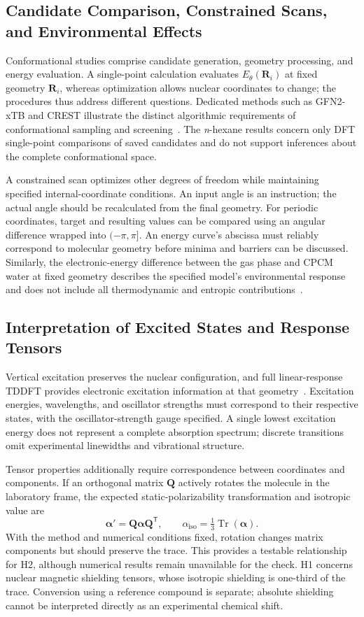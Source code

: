 \subsection{Candidate Comparison, Constrained Scans, and Environmental Effects}
Conformational studies comprise candidate generation, geometry processing, and energy evaluation.
A single-point calculation evaluates $E_{\theta}(\mathbf R_i)$ at fixed geometry $\mathbf R_i$, whereas optimization allows nuclear coordinates to change; the procedures thus address different questions.
Dedicated methods such as GFN2-xTB and CREST illustrate the distinct algorithmic requirements of conformational sampling and screening~\cite{gfn2,crest}.
The \textit{n}-hexane results concern only DFT single-point comparisons of saved candidates and do not support inferences about the complete conformational space.

A constrained scan optimizes other degrees of freedom while maintaining specified internal-coordinate conditions.
An input angle is an instruction; the actual angle should be recalculated from the final geometry.
For periodic coordinates, target and resulting values can be compared using an angular difference wrapped into $(-\pi,\pi]$.
An energy curve's abscissa must reliably correspond to molecular geometry before minima and barriers can be discussed.
Similarly, the electronic-energy difference between the gas phase and CPCM water at fixed geometry describes the specified model's environmental response and does not include all thermodynamic and entropic contributions~\cite{cpcm}.

\subsection{Interpretation of Excited States and Response Tensors}
Vertical excitation preserves the nuclear configuration, and full linear-response TDDFT provides electronic excitation information at that geometry~\cite{tddft}.
Excitation energies, wavelengths, and oscillator strengths must correspond to their respective states, with the oscillator-strength gauge specified.
A single lowest excitation energy does not represent a complete absorption spectrum; discrete transitions omit experimental linewidths and vibrational structure.

Tensor properties additionally require correspondence between coordinates and components.
If an orthogonal matrix $\mathbf Q$ actively rotates the molecule in the laboratory frame, the expected static-polarizability transformation and isotropic value are
\begin{equation}
  \boldsymbol\alpha'=\mathbf Q\boldsymbol\alpha\mathbf Q^{\mathsf T},
  \qquad \alpha_{\mathrm{iso}}=\tfrac13\operatorname{Tr}(\boldsymbol\alpha).
  \label{eq:tensor-rotation}
\end{equation}
With the method and numerical conditions fixed, rotation changes matrix components but should preserve the trace.
This provides a testable relationship for H2, although numerical results remain unavailable for the check.
H1 concerns nuclear magnetic shielding tensors, whose isotropic shielding is one-third of the trace.
Conversion using a reference compound is separate; absolute shielding cannot be interpreted directly as an experimental chemical shift.
